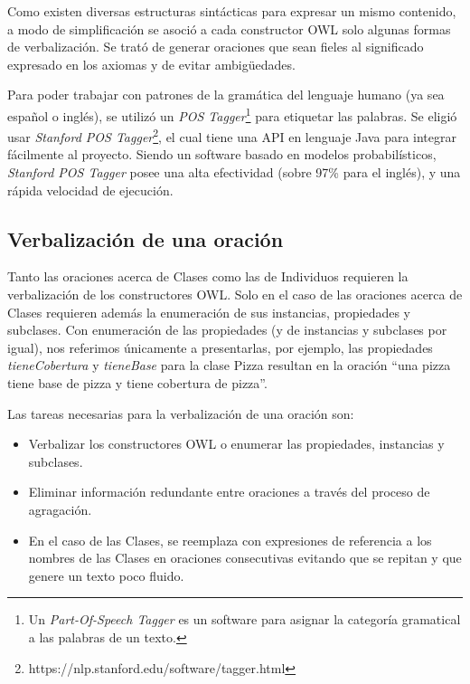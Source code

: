 Como existen diversas estructuras sintácticas para expresar un mismo contenido, a modo de simplificación se asoció a cada constructor OWL solo algunas formas de verbalización. Se trató de generar oraciones que sean fieles al significado expresado en los axiomas y de evitar ambigüedades.

Para poder trabajar con patrones de la gramática del lenguaje humano (ya sea español o inglés), se utilizó un \emph{POS Tagger}\footnote{Un \emph{Part-Of-Speech Tagger} es un software para asignar la categoría gramatical a las palabras de un texto.} para etiquetar las palabras. Se eligió usar \emph{Stanford POS Tagger}\footnote{https://nlp.stanford.edu/software/tagger.html}, el cual tiene una API en lenguaje Java para integrar fácilmente al proyecto. Siendo un software basado en modelos probabilísticos, \emph{Stanford POS Tagger} posee una alta efectividad (sobre 97\% para el inglés), y una rápida velocidad de ejecución.

\subsection{Verbalización de una oración}
Tanto las oraciones acerca de Clases como las de Individuos requieren la verbalización de los constructores OWL. Solo en el caso de las oraciones acerca de Clases requieren además la enumeración de sus instancias, propiedades y subclases. Con enumeración de las propiedades (y de instancias y subclases por igual), nos referimos únicamente a presentarlas, por ejemplo, las propiedades \emph{tieneCobertura} y \emph{tieneBase} para la clase Pizza resultan en la oración ``una pizza tiene base de pizza y tiene cobertura de pizza''.

Las tareas necesarias para la verbalización de una oración son:
\begin{itemize}
    \item Verbalizar los constructores OWL o enumerar las propiedades, instancias y subclases.
    \item Eliminar información redundante entre oraciones a través del proceso de agragación.
    \item En el caso de las Clases, se reemplaza con expresiones de referencia a los nombres de las Clases en oraciones consecutivas evitando que se repitan y que genere un texto poco fluido.
\end{itemize}

